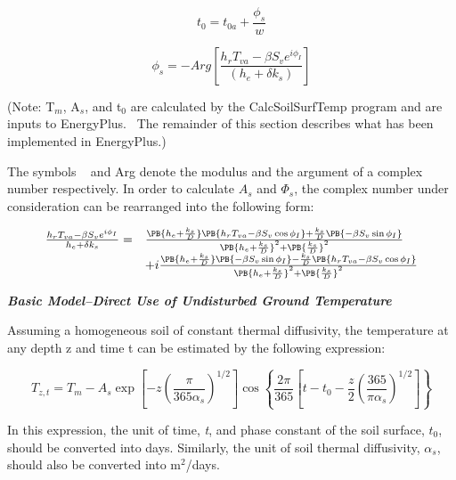 \begin{equation}
{t_0} = {t_{0a}} + \frac{{{\phi_s}}}{w}
\end{equation}

\begin{equation}
{\phi_s} =  - Arg\left[ {\frac{{{h_r}{T_{va}} - \beta {S_v}{e^{i{\phi_I}}}}}{{\left( {{h_e} + \delta {k_s}} \right)}}} \right]
\end{equation}

(Note: T\(_{m}\), A\(_{s}\), and t\(_{0}\) are calculated by the CalcSoilSurfTemp program and are inputs to EnergyPlus.~ The remainder of this section describes what has been implemented in EnergyPlus.)

The symbols \textbar{}\textbar{}~ \textbar{}\textbar{} and Arg denote the modulus and the argument of a complex number respectively. In order to calculate \(A_s\) and \(\Phi_s\), the complex number under consideration can be rearranged into the following form:

\begin{equation}
  \begin{array}{rl}
    \frac{h_r T_{va} - \beta S_v e^{i \phi_I}}{h_e + \delta k_s}
           =&  \frac{ \PB{h_e + \frac{k_s}{D}} \PB{ h_r T_{va} - \beta S_v \cos \phi_I} + \frac{k_s}{D} \PB{-\beta S_v \sin \phi_I}}{\PB{h_e + \frac{k_s}{D}}^2 + \PB{\frac{k_s}{D}}^2} \\
           &+ i\frac{ \PB{h_e + \frac{k_s}{D}} \PB{-\beta S_v \sin \phi_I} - \frac{k_s}{D} \PB{h_r T_{va} - \beta S_v \cos \phi_I}}{\PB{h_e + \frac{k_s}{D}}^2 + \PB{\frac{k_s}{D}}^2}
  \end{array}
\end{equation}

\emph{\textbf{Basic Model--Direct Use of Undisturbed Ground Temperature}}

Assuming a homogeneous soil of constant thermal diffusivity, the temperature at any depth z and time t can be estimated by the following expression:

\begin{equation}
{T_{z,t}} = {T_m} - {A_s}\exp \left[ { - z{{\left( {\frac{\pi }{{{\mathrm{365}}{\alpha_s}}}} \right)}^{1/2}}} \right]\cos \left\{ {\frac{{2\pi }}{{{\mathrm{365}}}}\left[ {t - {t_0} - \frac{z}{2}{{\left( {\frac{{{\mathrm{365}}}}{{\pi {\alpha_s}}}} \right)}^{1/2}}} \right]} \right\}
\end{equation}

In this expression, the unit of time, \emph{t}, and phase constant of the soil surface, \(t_{0}\), should be converted into days. Similarly, the unit of soil thermal diffusivity, \({\alpha_{s}}\), should also be converted into m\(^{2}\)/days.

